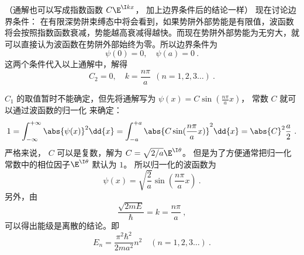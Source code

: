 （通解也可以写成指数函数 $C\E^{\I kx}$， 加上边界条件后的结论一样）
现在讨论边界条件： 在有限深势阱束缚态中将会看到，如果势阱外部势能是有限值，波函数将会按照指数函数衰减，势能越高衰减得越快。而现在势阱外部势能为无穷大，就可以直接认为波函数在势阱外部始终为零。所以边界条件为
\begin{equation}
\psi(0) = 0, \quad \psi(a) = 0~.
\end{equation}
这两个条件代入以上通解中，解得
\begin{equation}
C_2 = 0, \quad k = \frac{n\pi}{a}  \ \ (n = 1,2,3\dots)~.
\end{equation}

$C_1$ 的取值暂时不能确定，但先将通解写为 $\psi(x) = C\sin(\frac{n\pi }{a}x)$， 常数 $C$ 就可以通过波函数的归一化%
来确定：
\begin{equation}
1 = \int_{-\infty }^{+\infty } \abs{\psi(x)}^2 \dd{x}  = \int_{-a}^{+a} \abs{C\sin(\frac{n\pi }{a} x)}^2 \dd{x}  = \abs{C}^2 \frac{a}{2}~.
\end{equation}
严格来说， $C$ 可以是复数，解为 $C = \sqrt{2/a} \E^{\I\theta}$。 但是为了方便通常把归一化常数中的相位因子$\E^{\I\theta}$ 默认为 $1$。 所以归一化的波函数为
\begin{equation}
\psi(x) = \sqrt{\frac{2}{a}} \sin(\frac{n\pi }{a}x)~.
\end{equation}
另外，由
\begin{equation}
\frac{\sqrt{2mE}}{\hbar} = k = \frac{n\pi }{a}~,
\end{equation}
可以得出能级是离散的结论。即
\begin{equation}
E_n = \frac{\pi^2\hbar^2}{2m a^2} n^2 \quad (n = 1,2,3\dots)~.
\end{equation}

